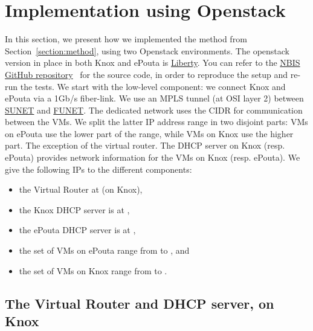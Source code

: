 \section{Implementation using Openstack}
\label{section:implementation}

In this section, we present how we implemented the method from
Section~\ref{section:method}, using two Openstack environments.
%
The openstack version in place in both Knox and ePouta is
\href{http://docs.openstack.org/liberty/install-guide-ubuntu/}{Liberty}.
%
%
You can refer to the
\href{https://github.com/NBISweden/Knox-ePouta}{NBIS GitHub
  repository}~\cite{nbis-knox-epouta} for the source code, in order to
reproduce the setup and re-run the tests.
%
We start with the low-level component: we connect Knox
and ePouta via a 1Gb/s fiber-link.
%
We use an MPLS tunnel (at OSI layer 2) between
\href{https://www.sunet.se/}{SUNET} and
\href{https://www.csc.fi/funet-network-services}{FUNET}.
%
The dedicated network uses the  CIDR for communication
between the VMs.
%
We split the latter IP address range in two disjoint parts: VMs on
ePouta use the lower part of the range, while VMs on Knox use the
higher part. The exception of the virtual router.
%
The DHCP server on Knox (resp. ePouta) provides network information
for the VMs on Knox (resp. ePouta).
%
We give the following IPs to the different components:
%
\begin{itemize}
\item the Virtual Router at  (on Knox),
\item the Knox DHCP server is at ,
\item the ePouta DHCP server is at ,
\item the set of VMs on ePouta range from  to , and
\item the set of VMs on Knox range from  to .
\end{itemize}

\subsection{The Virtual Router and DHCP server, on Knox}
\label{section:implementation:virtual:router}
\label{section:implementation:dhcp:server:knox}


